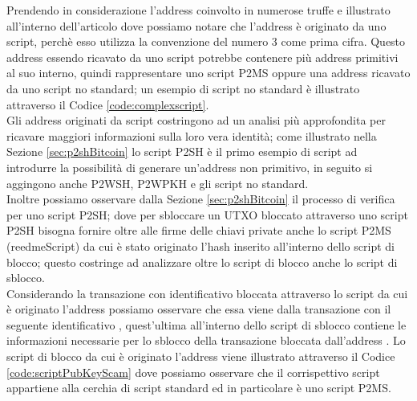  \begin{example}
   Prendendo in considerazione l'address  coinvolto in numerose truffe e illustrato all'interno dell'articolo \cite{biva:article} dove possiamo notare che l'address è originato da uno script, perchè esso utilizza la convenzione del numero 3 come prima cifra.
   Questo address essendo ricavato da uno script potrebbe contenere più address primitivi al suo interno, quindi rappresentare uno script P2MS oppure una address ricavato da uno script no standard; un esempio di script no standard è illustrato attraverso il Codice \ref{code:complexscript}.\\
   Gli address originati da script costringono ad un analisi più approfondita per ricavare maggiori informazioni sulla loro vera identità; come illustrato nella Sezione \ref{sec:p2shBitcoin} lo script P2SH è il primo esempio di script ad introdurre la possibilità di generare un'address non primitivo, in seguito si aggingono anche P2WSH, P2WPKH e gli script no standard.\\
   Inoltre possiamo osservare dalla Sezione \ref{sec:p2shBitcoin} il processo di verifica per uno script P2SH; dove per sbloccare un UTXO bloccato attraverso uno script P2SH bisogna fornire oltre alle firme delle chiavi private anche lo script P2MS (reedmeScript) da cui è stato originato l'hash inserito all'interno dello script di blocco; questo costringe ad analizzare oltre lo script di blocco anche lo script di sblocco.\\
   Considerando la transazione con identificativo  bloccata attraverso lo script da cui è originato l'address  possiamo osservare che essa viene  dalla transazione con il seguente identificativo , quest'ultima all'interno dello script di sblocco contiene le informazioni necessarie per lo sblocco della transazione bloccata dall'address .
   Lo script di blocco da cui è originato l'address viene illustrato attraverso il Codice \ref{code:scriptPubKeyScam} dove possiamo osservare che il corrispettivo script appartiene alla cerchia di script standard ed in particolare è uno script P2MS.
   \begin{lstlisting}[language=bitcoinscript, label={code:scriptPubKeyScam}, caption={Script da cui è originato l'address preso in esempio.}]

\end{lstlisting}
\end{example}
